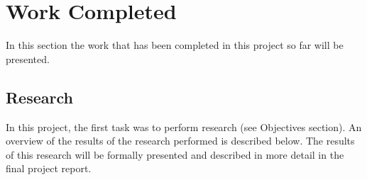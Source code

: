 \documentclass[a4paper,11pt]{article}
\begin{document}
\section{Work Completed}

In this section the work that has been completed in this project so far will be presented.

\subsection{Research}

In this project, the first task was to perform research (see Objectives section). An overview of the results of the research performed is described below. The results of this research will be formally presented and described in more detail in the final project report.
\end{document}
